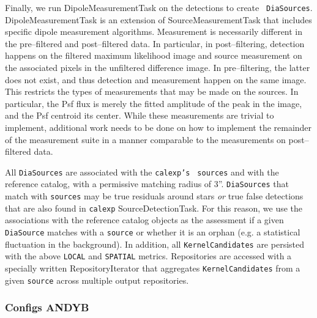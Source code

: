 \documentclass[prd, nofootinbib, floatfix, 11pt,tightenlines,times]{article}
\begin{document}
Finally, we run DipoleMeasurementTask on the detections to create {\tt
  DiaSources}.  DipoleMeasurementTask is an extension of
SourceMeasurementTask that includes specific dipole measurement
algorithms.  Measurement is necessarily different in the pre--filtered
and post--filtered data.  In particular, in post--filtering, detection
happens on the filtered maximum likelihood image and source
measurement on the associated pixels in the unfiltered difference
image.  In pre--filtering, the latter does not exist, and thus
detection and measurement happen on the same image.  This restricts
the types of measurements that may be made on the sources.  In
particular, the Psf flux is merely the fitted amplitude of the peak in
the image, and the Psf centroid its center.  While these measurements
are trivial to implement, additional work needs to be done on how to
implement the remainder of the measurement suite in a manner comparable
to the measurements on post--filtered data.

All {\tt DiaSources} are associated with the {\tt calexp's} {\tt
  sources} and with the reference catalog, with a permissive matching
radius of 3''.  {\tt DiaSources} that match with {\tt sources} may be
true residuals around stars {\it or} true false detections that are
also found in {\tt calexp} SourceDetectionTask.  For this reason, we
use the associations with the reference catalog objects as the
assessment if a given {\tt DiaSource} matches with a {\tt source} or
whether it is an orphan (e.g. a statistical fluctuation in the
background).  In addition, all {\tt KernelCandidates} are persisted
with the above {\tt LOCAL} and {\tt SPATIAL} metrics.  Repositories
are accessed with a specially written RepositoryIterator that
aggregates {\tt KernelCandidates} from a given {\tt source} across
multiple output repositories.

\subsubsection{Configs {\bf ANDYB}}
\end{document}
